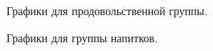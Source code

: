 \documentclass[10pt, a4paper]{article}
\begin{document}
\begin{figure}[H]
\centering{}
\caption{Графики для продовольственной группы.}
\end{figure}

\begin{figure}[H]
\centering{}
\caption{Графики для группы напитков.}
\end{figure}
\end{document}
